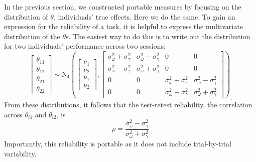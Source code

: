 \documentclass[english,man]{apa6}
\theoremstyle{definition}
\theoremstyle{definition}
\theoremstyle{remark}
\begin{document}
In the previous section, we constructed portable measures by focusing on
the distribution of \(\theta\), individuals' true effects. Here we do
the same. To gain an expression for the reliability of a task, it is
helpful to express the multivariate distribution of the \(\theta\)s. The
easiest way to do this is to write out the distribution for two
individuals' performance across two sessions: \[
\begin{bmatrix} \theta_{11} \\ \theta_{12} \\ \theta_{21} \\ \theta_{22} \end{bmatrix}
\sim \mbox{N}_4\left(
\begin{bmatrix} \nu_1 \\ \nu_2 \\ \nu_1 \\ \nu_2 \end{bmatrix},
\begin{bmatrix} 
\sigma^2_\omega+\sigma^2_\gamma & \sigma^2_\omega-\sigma^2_\gamma& 0 & 0\\ 
\sigma^2_\omega-\sigma^2_\gamma & \sigma^2_\omega+\sigma^2_\gamma & 0 & 0\\
0 & 0 &\sigma^2_\omega+\sigma^2_\gamma & \sigma^2_\omega-\sigma^2_\gamma \\ 
0 & 0 & \sigma^2_\omega-\sigma^2_\gamma & \sigma^2_\omega+\sigma^2_\gamma
\end{bmatrix}
\right)_.
\] From these distributions, it follows that the test-retest
reliability, the correlation across \(\theta_{i1}\) and \(\theta_{i2}\),
is \[
\rho = \frac{\sigma^2_\omega-\sigma^2_\gamma}{\sigma^2_\omega+\sigma^2_\gamma}
\] Importantly, this reliability is portable as it does not include
trial-by-trial variability.
\end{document}
